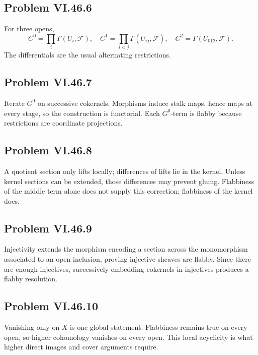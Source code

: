 \subsection*{Problem VI.46.6}
\begin{solution}
For three opens,
\[
C^0=\prod_i\Gamma(U_i,\mathcal F),\quad
C^1=\prod_{i<j}\Gamma(U_{ij},\mathcal F),\quad
C^2=\Gamma(U_{012},\mathcal F).
\]
The differentials are the usual alternating restrictions.
\end{solution}

\subsection*{Problem VI.46.7}
\begin{solution}
Iterate \(G^0\) on successive cokernels.  Morphisms induce stalk maps, hence maps at every stage, so the construction is functorial.  Each \(G^0\)-term is flabby because restrictions are coordinate projections.
\end{solution}

\subsection*{Problem VI.46.8}
\begin{solution}
A quotient section only lifts locally; differences of lifts lie in the kernel.  Unless kernel sections can be extended, those differences may prevent gluing.  Flabbiness of the middle term alone does not supply this correction; flabbiness of the kernel does.
\end{solution}

\subsection*{Problem VI.46.9}
\begin{solution}
Injectivity extends the morphism encoding a section across the monomorphism associated to an open inclusion, proving injective sheaves are flabby.  Since there are enough injectives, successively embedding cokernels in injectives produces a flabby resolution.
\end{solution}

\subsection*{Problem VI.46.10}
\begin{solution}
Vanishing only on \(X\) is one global statement.  Flabbiness remains true on every open, so higher cohomology vanishes on every open.  This local acyclicity is what higher direct images and cover arguments require.
\end{solution}

